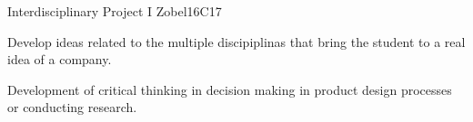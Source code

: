 \begin{syllabus}
\begin{unit}{Interdisciplinary Project I }{}{Zobel}{16}{C17}
\begin{topics}
      \item Develop ideas related to the multiple discipiplinas that bring the student to a real idea of a company.
\end{topics}

\begin{learningoutcomes}
   \item Development of critical thinking in decision making in product design processes or conducting research.
\end{learningoutcomes}
\end{unit}

\begin{coursebibliography}
\end{coursebibliography}

\end{syllabus}
